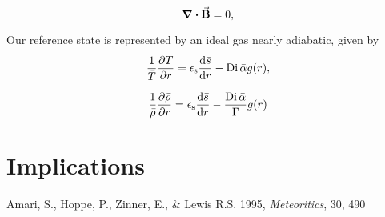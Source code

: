 \documentclass{iau}
\DeclareMathOperator{\di}{\mathrm{Di}}
\begin{document}
\begin{equation}
\div \va{B} = 0,  
\end{equation}




Our reference state is represented by an ideal gas nearly adiabatic, given by
\begin{equation} 
\frac{1}{\bar{T}}\pdv{\bar{T}}{r}  =  \epsilon_\mathrm{s} \dv{\bar{s}}{r}  - \di \bar{\alpha}g(r),  
\end{equation}

\begin{equation} 
\frac{1}{\bar{\rho}}\pdv{\bar{\rho}}{r}  =  \epsilon_\mathrm{s} \dv{\bar{s}}{r}  - \frac{\di \bar{\alpha}}{\Gamma}g(r)
\end{equation}


\section{Implications}

\begin{thebibliography}{}

{Amari, S., Hoppe, P., Zinner, E., \& Lewis R.S.} 1995,
\textit{Meteoritics}, 30, 490 


\end{thebibliography}
\end{document}
